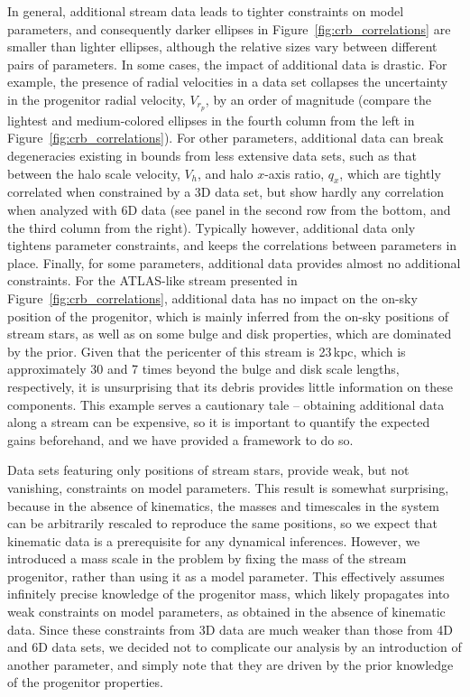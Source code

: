 \documentclass[modern]{aastex61}
\begin{document}
In general, additional stream data leads to tighter constraints on model parameters, and consequently darker ellipses in Figure~\ref{fig:crb_correlations} are smaller than lighter ellipses, although the relative sizes vary between different pairs of parameters.
In some cases, the impact of additional data is drastic.
For example, the presence of radial velocities in a data set collapses the uncertainty in the progenitor radial velocity, $V_{r_p}$, by an order of magnitude (compare the lightest and medium-colored ellipses in the fourth column from the left in Figure~\ref{fig:crb_correlations}).
For other parameters, additional data can break degeneracies existing in bounds from less extensive data sets, such as that between the halo scale velocity, $V_h$, and halo $x$-axis ratio, $q_x$, which are tightly correlated when constrained by a 3D data set, but show hardly any correlation when analyzed with 6D data (see panel in the second row from the bottom, and the third column from the right).
Typically however, additional data only tightens parameter constraints, and keeps the correlations between parameters in place.
Finally, for some parameters, additional data provides almost no additional constraints.
For the ATLAS-like stream presented in Figure~\ref{fig:crb_correlations}, additional data has no impact on the on-sky position of the progenitor, which is mainly inferred from the on-sky positions of stream stars, as well as on some bulge and disk properties, which are dominated by the prior.
Given that the pericenter of this stream is 23\,kpc, which is approximately 30 and 7 times beyond the bulge and disk scale lengths, respectively, it is unsurprising that its debris provides little information on these components.
This example serves a cautionary tale -- obtaining additional data along a stream can be expensive, so it is important to quantify the expected gains beforehand, and we have provided a framework to do so.

Data sets featuring only positions of stream stars, provide weak, but not vanishing, constraints on model parameters.
This result is somewhat surprising, because in the absence of kinematics, the masses and timescales in the system can be arbitrarily rescaled to reproduce the same positions, so we expect that kinematic data is a prerequisite for any dynamical inferences.
However, we introduced a mass scale in the problem by fixing the mass of the stream progenitor, rather than using it as a model parameter.
This effectively assumes infinitely precise knowledge of the progenitor mass, which likely propagates into weak constraints on model parameters, as obtained in the absence of kinematic data.
Since these constraints from 3D data are much weaker than those from 4D and 6D data sets, we decided not to complicate our analysis by an introduction of another parameter, and simply note that they are driven by the prior knowledge of the progenitor properties.
\end{document}
